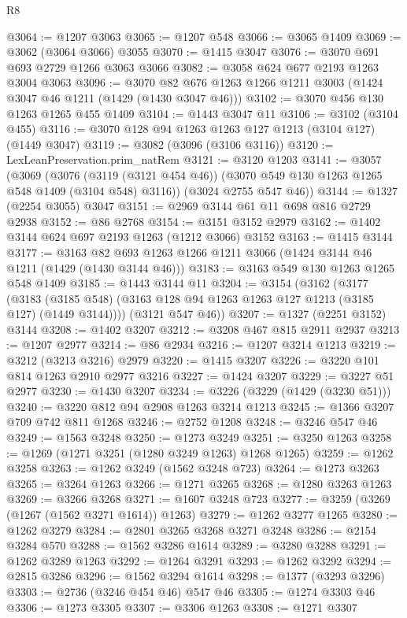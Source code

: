 \begin{lexlean}{R8}
\begin{coremodule}
@3064 := @1207 @3063
@3065 := @1207 @548
@3066 := @3065 @1409
@3069 := @3062 (@3064 @3066) @3055
@3070 := @1415 @3047
@3076 := @3070 @691 @693 @2729 @1266 @3063 @3066
@3082 := @3058 @624 @677 @2193 @1263 @3004 @3063
@3096 := @3070 @82 @676 @1263 @1266 @1211 @3003 (@1424 @3047 @46 @1211 (@1429 (@1430 @3047 @46)))
@3102 := @3070 @456 @130 @1263 @1265 @455 @1409
@3104 := @1443 @3047 @11
@3106 := @3102 (@3104 @455)
@3116 := @3070 @128 @94 @1263 @1263 @127 @1213 (@3104 @127) (@1449 @3047)
@3119 := @3082 (@3096 (@3106 @3116))
@3120 := LexLeanPreservation.prim_natRem
@3121 := @3120 @1203
@3141 := @3057
    (@3069
      (@3076 (@3119 (@3121 @454 @46)) (@3070 @549 @130 @1263 @1265 @548 @1409 (@3104 @548) @3116))
      (@3024 @2755 @547 @46))
@3144 := @1327 (@2254 @3055) @3047
@3151 := @2969 @3144 @61 @11 @698 @816 @2729 @2938
@3152 := @86 @2768
@3154 := @3151 @3152 @2979
@3162 := @1402 @3144 @624 @697 @2193 @1263 (@1212 @3066) @3152
@3163 := @1415 @3144
@3177 := @3163 @82 @693 @1263 @1266 @1211 @3066 (@1424 @3144 @46 @1211 (@1429 (@1430 @3144 @46)))
@3183 := @3163 @549 @130 @1263 @1265 @548 @1409
@3185 := @1443 @3144 @11
@3204 := @3154
    (@3162
      (@3177
        (@3183 (@3185 @548) (@3163 @128 @94 @1263 @1263 @127 @1213 (@3185 @127) (@1449 @3144))))
      (@3121 @547 @46))
@3207 := @1327 (@2251 @3152) @3144
@3208 := @1402 @3207
@3212 := @3208 @467 @815 @2911 @2937
@3213 := @1207 @2977
@3214 := @86 @2934
@3216 := @1207 @3214 @1213
@3219 := @3212 (@3213 @3216) @2979
@3220 := @1415 @3207
@3226 := @3220 @101 @814 @1263 @2910 @2977 @3216
@3227 := @1424 @3207
@3229 := @3227 @51 @2977
@3230 := @1430 @3207
@3234 := @3226 (@3229 (@1429 (@3230 @51)))
@3240 := @3220 @812 @94 @2908 @1263 @3214 @1213
@3245 := @1366 @3207 @709 @742 @811 @1268
@3246 := @2752 @1208
@3248 := @3246 @547 @46
@3249 := @1563 @3248
@3250 := @1273 @3249
@3251 := @3250 @1263
@3258 := @1269 (@1271 @3251 (@1280 @3249 @1263) @1268 @1265)
@3259 := @1262 @3258
@3263 := @1262 @3249 (@1562 @3248 @723)
@3264 := @1273 @3263
@3265 := @3264 @1263
@3266 := @1271 @3265
@3268 := @1280 @3263 @1263
@3269 := @3266 @3268
@3271 := @1607 @3248 @723
@3277 := @3259 (@3269 (@1267 (@1562 @3271 @1614)) @1263)
@3279 := @1262 @3277 @1265
@3280 := @1262 @3279
@3284 := @2801 @3265 @3268 @3271 @3248
@3286 := @2154 @3284 @570
@3288 := @1562 @3286 @1614
@3289 := @3280 @3288
@3291 := @1262 @3289 @1263
@3292 := @1264 @3291
@3293 := @1262 @3292
@3294 := @2815 @3286
@3296 := @1562 @3294 @1614
@3298 := @1377 (@3293 @3296)
@3303 := @2736 (@3246 @454 @46) @547 @46
@3305 := @1274 @3303 @46
@3306 := @1273 @3305
@3307 := @3306 @1263
@3308 := @1271 @3307

\end{coremodule}
\end{lexlean}
